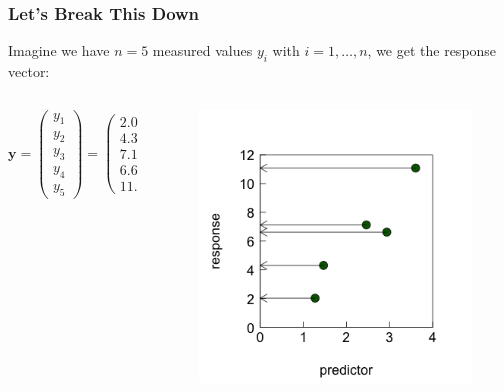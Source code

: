 \documentclass{beamer}
\begin{document}
\begin{frame}
    \frametitle{Let's Break This Down}
    Imagine we have $n = 5$ measured values $y_i$ with $i = 1, \ldots, n$, we get the response vector:
    \vspace{0.5cm}
    \begin{columns}
        \begin{column}{0.44\textwidth}
        \begin{equation*}
        \mathbf{y} = \left( \begin{array}{c} y_1 \\ y_2 \\ y_3 \\ y_4 \\ y_5 \end{array}\right) = \left( \begin{array}{c} 2.03 \\ 4.31 \\ 7.12 \\ 6.62 \\ 11.07 \end{array}\right) 
        \end{equation*}   
    \end{column}
    \begin{column}{0.44\textwidth}
        \begin{figure}[h]
        \centering
        \includegraphics[width=0.999\textwidth]{lectures/day_2_LM_refresh_I/figures/unnamed-chunk-12-1.png}
    \end{figure}
    \end{column}
    \end{columns}
    
\end{frame}
\end{document}
